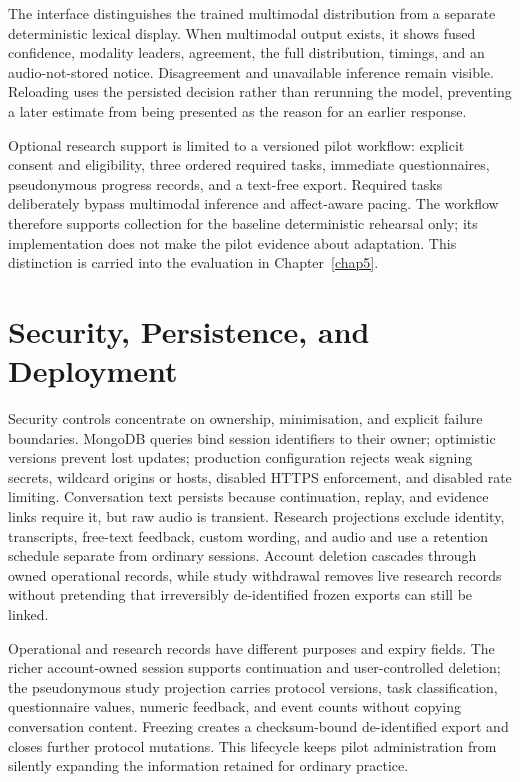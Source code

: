 The interface distinguishes the trained multimodal distribution from a separate deterministic lexical display. When multimodal output exists, it shows fused confidence, modality leaders, agreement, the full distribution, timings, and an audio-not-stored notice. Disagreement and unavailable inference remain visible. Reloading uses the persisted decision rather than rerunning the model, preventing a later estimate from being presented as the reason for an earlier response.
\label{subsec:frontend-affect-presentation}

Optional research support is limited to a versioned pilot workflow: explicit consent and eligibility, three ordered required tasks, immediate questionnaires, pseudonymous progress records, and a text-free export. Required tasks deliberately bypass multimodal inference and affect-aware pacing. The workflow therefore supports collection for the baseline deterministic rehearsal only; its implementation does not make the pilot evidence about adaptation. This distinction is carried into the evaluation in Chapter~\ref{chap5}.
\label{sec:research-workflow-implementation}

\section{Security, Persistence, and Deployment}
\label{sec:security-privacy-data-protection}
\label{sec:deployment-configuration}

Security controls concentrate on ownership, minimisation, and explicit failure boundaries. MongoDB queries bind session identifiers to their owner; optimistic versions prevent lost updates; production configuration rejects weak signing secrets, wildcard origins or hosts, disabled HTTPS enforcement, and disabled rate limiting. Conversation text persists because continuation, replay, and evidence links require it, but raw audio is transient. Research projections exclude identity, transcripts, free-text feedback, custom wording, and audio and use a retention schedule separate from ordinary sessions. Account deletion cascades through owned operational records, while study withdrawal removes live research records without pretending that irreversibly de-identified frozen exports can still be linked.

Operational and research records have different purposes and expiry fields. The richer account-owned session supports continuation and user-controlled deletion; the pseudonymous study projection carries protocol versions, task classification, questionnaire values, numeric feedback, and event counts without copying conversation content. Freezing creates a checksum-bound de-identified export and closes further protocol mutations. This lifecycle keeps pilot administration from silently expanding the information retained for ordinary practice.

